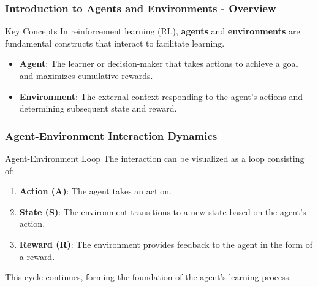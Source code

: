\documentclass[aspectratio=169]{beamer}
\begin{document}
\frame{\titlepage}

\begin{frame}[fragile]
    \frametitle{Introduction to Agents and Environments - Overview}
    
    \begin{block}{Key Concepts}
        In reinforcement learning (RL), \textbf{agents} and \textbf{environments} are fundamental constructs that interact to facilitate learning.
    \end{block}
    
    \begin{itemize}
        \item \textbf{Agent}: The learner or decision-maker that takes actions to achieve a goal and maximizes cumulative rewards.
        \item \textbf{Environment}: The external context responding to the agent’s actions and determining subsequent state and reward.
    \end{itemize}
\end{frame}

\begin{frame}[fragile]
    \frametitle{Agent-Environment Interaction Dynamics}
    
    \begin{block}{Agent-Environment Loop}
        The interaction can be visualized as a loop consisting of:
    \end{block}

    \begin{enumerate}
        \item \textbf{Action (A)}: The agent takes an action.
        \item \textbf{State (S)}: The environment transitions to a new state based on the agent's action.
        \item \textbf{Reward (R)}: The environment provides feedback to the agent in the form of a reward.
    \end{enumerate}
    
    This cycle continues, forming the foundation of the agent’s learning process.
\end{frame}
\end{document}
